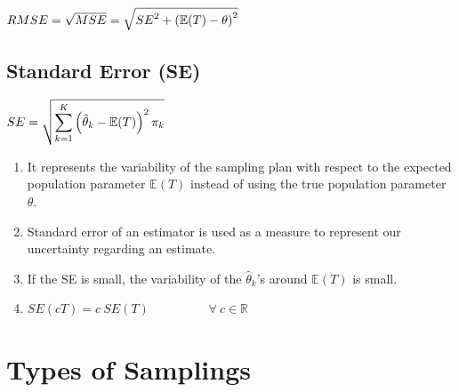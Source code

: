 \hfill
$
    RMSE 
    = \sqrt{MSE} 
    = \sqrt{{SE}^2 + \left(\mathbb{E}(T) - \theta\right)^2}
$
\hfill \cite{statistics/book/Statistics-for-Data-Scientists/Maurits-Kaptein}






\subsection{Standard Error (SE)}\label{Sampling Plans/Measures of closeness/Standard Error (SE)}


\hfill
$
    SE = \sqrt{
        \displaystyle\sum_{k=1}^{K} \left(
            \hat{\theta}_k - \mathbb{E}(T)
        \right)^2
        \pi_k
    }
$
\hfill \cite{statistics/book/Statistics-for-Data-Scientists/Maurits-Kaptein}


\begin{enumerate}[itemsep=0.2cm]
    \item It represents the variability of the sampling plan with respect to the expected population parameter $\mathbb{E}(T)$ instead of using the true population parameter $\theta$.
    \hfill \cite{statistics/book/Statistics-for-Data-Scientists/Maurits-Kaptein}

    \item Standard error of an estimator is used as a measure to represent our uncertainty regarding an estimate.
    \hfill \cite{statistics/book/Statistics-for-Data-Scientists/Maurits-Kaptein}

    \item If the SE is small, the variability of the $\hat{\theta}_k$’s around $\mathbb{E}(T)$ is small. 
    \hfill \cite{statistics/book/Statistics-for-Data-Scientists/Maurits-Kaptein}

    \item $SE(cT ) = c\ SE(T) \hspace{2cm} \forall\  c \in \mathbb{R}$
    \hfill \cite{statistics/book/Statistics-for-Data-Scientists/Maurits-Kaptein}
\end{enumerate}








\section{Types of Samplings}

